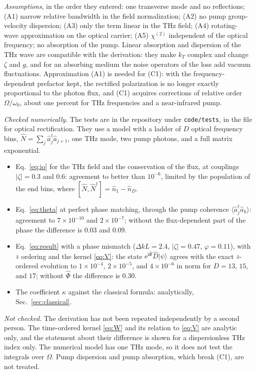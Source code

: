 \documentclass[aps,pra,onecolumn,notitlepage,11pt,amsmath,amssymb,nofootinbib]{revtex4-2}
\newcommand{\Nop}{\hat N}
\newcommand{\ee}{\mathrm{e}}
\newcommand{\ii}{\mathrm{i}}
\begin{document}
\emph{Assumptions}, in the order they entered: one transverse mode and no
reflections; (A1) narrow relative bandwidth in the field normalization; (A2)
no pump group-velocity dispersion; (A3) only the term linear in the THz field;
(A4) rotating-wave approximation on the optical carrier; (A5) $\chi^{(2)}$
independent of the optical frequency; no absorption of the pump. Linear
absorption and dispersion of the THz wave are compatible with the derivation:
they make $k_T$ complex and change $\zeta$ and $g$, and for an absorbing
medium the noise operators of the loss add vacuum fluctuations. Approximation
(A1) is needed for (C1): with the frequency-dependent prefactor kept, the
rectified polarization is no longer exactly proportional to the photon flux,
and (C1) acquires corrections of relative order $\Omega/\omega_0$, about one
percent for THz frequencies and a near-infrared pump.

\emph{Checked numerically.} The tests are in the repository under
\texttt{code/tests}, in the file for optical rectification. They use a model
with a ladder of $D$ optical frequency bins,
$\Nop=\sum_j\hat a_j^\dagger\hat a_{j+1}$, one THz mode, two pump photons, and
a full matrix exponential.
\begin{itemize}
\item Eq.~\eqref{eq:io} for the THz field and the conservation of the flux, at
couplings $|\zeta|=0.3$ and $0.6$: agreement to better than $10^{-6}$, limited
by the population of the end bins, where $[\Nop,\Nop^\dagger]=\hat n_1-\hat n_D$.
\item Eq.~\eqref{eq:theta} at perfect phase matching, through the pump
coherence $\langle\hat a_j^\dagger\hat a_k\rangle$: agreement to
$7\times10^{-10}$ and $2\times10^{-7}$; without the flux-dependent part of the phase the difference is
$0.03$ and $0.09$.
\item Eq.~\eqref{eq:result} with a phase mismatch ($\Delta kL=2.4$,
$|\zeta|=0.47$, $\varphi=0.11$), with $z$ ordering and the kernel
\eqref{eq:V}: the state $\ee^{\ii\hat\Phi}\hat D|\psi\rangle$ agrees with the
exact $z$-ordered evolution to $1\times10^{-4}$, $2\times10^{-5}$, and
$4\times10^{-6}$ in norm for $D=13$, $15$, and $17$; without $\hat\Phi$ the
difference is $0.30$.
\item The coefficient $\kappa$ against the classical formula: analytically,
Sec.~\ref{sec:classical}.
\end{itemize}

\emph{Not checked.} The derivation has not been repeated independently by a
second person. The time-ordered kernel \eqref{eq:W} and its relation to
\eqref{eq:V} are analytic only, and the statement about their difference is
shown for a dispersionless THz index only. The numerical model has one THz
mode, so it does not test the integrals over $\Omega$. Pump dispersion and
pump absorption, which break (C1), are not treated.
\end{document}
